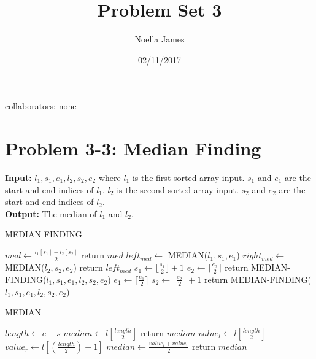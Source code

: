 \documentclass{article}
\theoremstyle{definition}
\theoremstyle{remark}
\theoremstyle{plain}
\begin{document}
\title{Problem Set 3}
\date{02/11/2017}
\author{Noella James}
\maketitle
collaborators: none\\

\section{Problem 3-3: Median Finding}

\textbf{Input:} $l_1, s_1, e_1, l_2, s_2, e_2$ where $l_1$ is the first sorted array input. $s_1$ and $e_1$ are the start and end indices of $l_1$. $l_2$ is the second sorted array input. $s_2$ and $e_2$ are the start and end indices of $l_2$.\\
\textbf{Output:} The median of $l_1$ and $l_2$.\\
\begin{algorithm}
\caption{MEDIAN FINDING}\label{Find the median of two sorted arrays}
\begin{algorithmic}[1]
	 
		\State $med \gets \frac {{l_1}[s_1] + {l_2}[s_2]}{2}$
		\State return $med$
	\EndIf
	\State $left_{med} \gets$ MEDIAN($l_1, s_1, e_1$)
	\State $right_{med} \gets$ MEDIAN($l_2, s_2, e_2$)
		\State return $left_{med}$
		\State $s_1 \gets \lfloor\frac {s_1} {2}\rfloor + 1$
		\State $e_2 \gets \lceil\frac {e_2}{2}\rceil$
		\State return MEDIAN-FINDING($l_1, s_1, e_1, l_2, s_2, e_2$)
	\Else {}
		\State $e_1 \gets \lceil\frac {e_1}{2}\rceil$
		\State $s_2 \gets \lfloor\frac {s_2} {2}\rfloor + 1$
		\State return MEDIAN-FINDING($l_1, s_1, e_1, l_2, s_2, e_2$)
	\EndIf
\EndProcedure
\end{algorithmic}
\end{algorithm}

\begin{algorithm}
\caption{MEDIAN}\label{Find the median of a sorted array}
\begin{algorithmic}[1]
 
	\State $length \gets {e - s}$
		\State $median \gets l[\frac {length}{2}]$
		\State return $median$
	\Else
		\State $value_l \gets l[\frac {length}{2}]$
		\State $value_r \gets l[(\frac {length}{2}) + 1]$
		\State $median \gets \frac{value_l + value_r}{2}$
		\State return $median$
	\EndIf
\EndProcedure
\end{algorithmic}
\end{algorithm}
\end{document}
